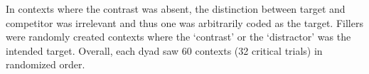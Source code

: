 \documentclass[10pt,letterpaper]{article}
\begin{document}
In contexts where the contrast was absent, the distinction between target and competitor was irrelevant and thus one was arbitrarily coded as the target. Fillers were randomly created contexts where the `contrast' or the `distractor' was the intended target. Overall, each dyad saw 60 contexts (32 critical trials) in randomized order.


%
%
\end{document}
